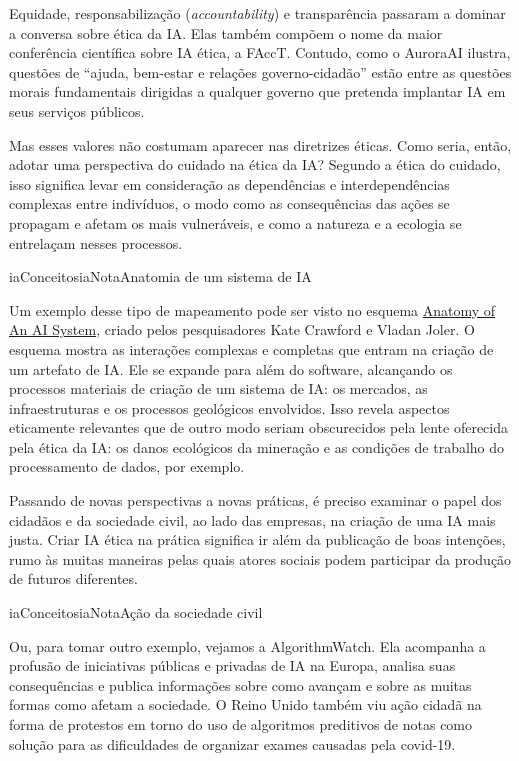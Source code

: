 \documentclass[
  11pt,
]{article}
\newenvironment{tecnica}[1][Nota tecnica]{\begin{iabox}{iaConceitos}{iaNota}{#1}}{\end{iabox}}
\newenvironment{nota}[1][Nota]{\begin{iabox}{iaConceitos}{iaNota}{#1}}{\end{iabox}}
\begin{document}
Equidade, responsabilização (\emph{accountability}) e transparência
passaram a dominar a conversa sobre ética da IA. Elas também compõem o
nome da maior conferência científica sobre IA ética, a FAccT. Contudo,
como o AuroraAI ilustra, questões de ``ajuda, bem-estar e relações
governo-cidadão'' estão entre as questões morais fundamentais dirigidas
a qualquer governo que pretenda implantar IA em seus serviços públicos.

Mas esses valores não costumam aparecer nas diretrizes éticas. Como
seria, então, adotar uma perspectiva do cuidado na ética da IA? Segundo
a ética do cuidado, isso significa levar em consideração as dependências
e interdependências complexas entre indivíduos, o modo como as
consequências das ações se propagam e afetam os mais vulneráveis, e como
a natureza e a ecologia se entrelaçam nesses processos.

\begin{tecnica}[Anatomia de um sistema de IA]

Um exemplo desse tipo de mapeamento pode ser visto no esquema
\href{https://anatomyof.ai/img/ai-anatomy-map.pdf}{Anatomy of An AI
System}, criado pelos pesquisadores Kate Crawford e Vladan Joler. O
esquema mostra as interações complexas e completas que entram na criação
de um artefato de IA. Ele se expande para além do software, alcançando
os processos materiais de criação de um sistema de IA: os mercados, as
infraestruturas e os processos geológicos envolvidos. Isso revela
aspectos eticamente relevantes que de outro modo seriam obscurecidos
pela lente oferecida pela ética da IA: os danos ecológicos da mineração
e as condições de trabalho do processamento de dados, por exemplo.

\end{tecnica}

Passando de novas perspectivas a novas práticas, é preciso examinar o
papel dos cidadãos e da sociedade civil, ao lado das empresas, na
criação de uma IA mais justa. Criar IA ética na prática significa ir
além da publicação de boas intenções, rumo às muitas maneiras pelas
quais atores sociais podem participar da produção de futuros diferentes.

\begin{nota}[Ação da sociedade civil]

Ou, para tomar outro exemplo, vejamos a AlgorithmWatch. Ela acompanha a
profusão de iniciativas públicas e privadas de IA na Europa, analisa
suas consequências e publica informações sobre como avançam e sobre as
muitas formas como afetam a sociedade. O Reino Unido também viu ação
cidadã na forma de protestos em torno do uso de algoritmos preditivos de
notas como solução para as dificuldades de organizar exames causadas
pela covid-19.

\end{nota}
\end{document}
